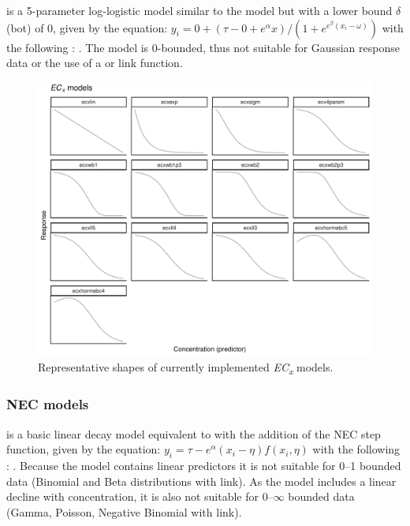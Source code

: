\documentclass[
  shortnames]{jss}
\begin{document}
 is a 5-parameter log-logistic model similar to the  model but with a lower bound \(\delta\) (bot) of 0, given by the equation:
\(y_i = 0 + (\tau - 0 + e^{\alpha} x)/ (1 + e^{e^{\beta} (x_i - \omega)})\)
with the following : . The model is 0-bounded, thus not suitable for Gaussian response data or the use of a  or  link function.

\begin{figure}[ht]
  \centering
  \includegraphics[width=1\textwidth]{../vignettes/vignette-fig-exmp2b-theoretical_ecx_curves.pdf}
  \caption{Representative shapes of currently implemented  \textit{EC\textsubscript{x}} models.}
  \label{fig1}
\end{figure}

\subsubsection[NEC models]{NEC models}\label{nec-models}

 is a basic linear decay model equivalent to  with the addition of the NEC step function, given by the equation:
\(y_i = \tau - e^{\alpha} \left(x_i - \eta \right) f(x_i, \eta)\)
with the following : . Because the model contains linear predictors it is not suitable for 0--1 bounded data (Binomial and Beta distributions with  link). As the model includes a linear decline with concentration, it is also not suitable for 0--\(\infty\) bounded data (Gamma, Poisson, Negative Binomial with  link).
\end{document}
